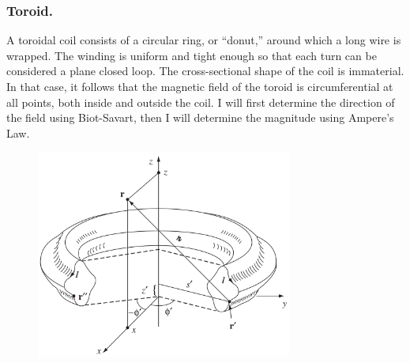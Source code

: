 \documentclass[../../../main.tex]{subfiles}
\begin{document}
\subsubsection*{Toroid.} A toroidal coil consists of a circular ring, or “donut,” around which a long wire is wrapped. The winding is uniform and tight enough so that each turn can be considered a plane closed loop. The cross-sectional shape of the coil is immaterial. In that case, it follows that the magnetic ﬁeld of the toroid is circumferential at all points, both inside and outside the coil. I will first determine the direction of the field using Biot-Savart, then I will determine the magnitude using Ampere's Law.

\begin{figure}
    \centering
    \includegraphics[width=0.75\textwidth]{../Rss/Electromagnetism/Magnetostatics/Toroid.png}
\end{figure}
\end{document}
